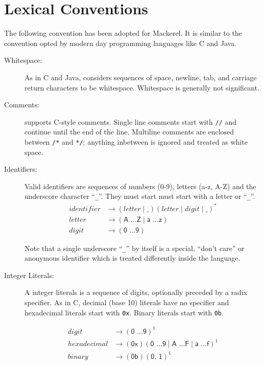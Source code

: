 \documentclass[a4paper,11pt,twoside]{report}
\begin{document}


\chapter{Lexical Conventions}\label{chap:lexical}
The following convention has been adopted for Mackerel. It is similar to
the convention opted by modern day programming languages like C and Java.\\

\begin{description}
\item[Whitespace:]  As in C and Java, \Mac considers sequences of
  space, newline, tab, and carriage return characters to be
  whitespace.  Whitespace is generally not significant. 

\item[Comments:] \Mac supports C-style comments.  Single line comments
  start with \texttt{//} and continue until the end of the line.
  Multiline comments are enclosed between \texttt{/*} and \texttt{*/};
  anything inbetween is ignored and treated as white space.

\item[Identifiers:] Valid \Mac identifiers are sequences of numbers
  (0-9), letters (a-z, A-Z) and the underscore character ``\texttt{\_}''.  They
  must start must start with a letter or ``\texttt{\_}''.  
  \begin{align*}
    identifier & \rightarrow ( letter \mid \_ ) (letter \mid digit \mid \_)^{\textrm{*}} \\
    letter & \rightarrow (\textsf{A \ldots Z} \mid  \textsf{a \ldots z})\\
    digit & \rightarrow (\textsf{0 \ldots 9})
\end{align*}

  Note that a single underscore ``\texttt{\_}'' by itself is a special,
  ``don't care'' or anonymous identifier which is treated differently
  inside the language. 
  
\item[Integer Literals:] A \Mac integer literals is a sequence of
  digits, optionally preceded by a radix specifier.  As in C, decimal (base 10)
  literals have no specifier and hexadecimal literals start with
  \texttt{0x}.  Binary literals start with \texttt{0b}. 

\begin{align*}
digit & \rightarrow (\textsf{0 \ldots 9})^{\textrm{1}}\\
hexadecimal & \rightarrow (\textsf{0x})(\textsf{0 \ldots 9} \mid \textsf{A \ldots F} \mid \textsf{a \ldots f})^{\textrm{1}}\\
binary & \rightarrow (\textsf{0b})(\textsf{0, 1})^{\textrm{1}}\\
\end{align*}



\end{description}
\end{document}
